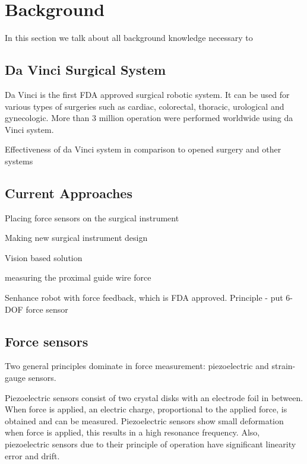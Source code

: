 \chapter{Background}
\label{back}

In this section we talk about all background knowledge necessary to 

\section{Da Vinci Surgical System}
\label{sec:daVinci}

Da Vinci is the first FDA approved surgical robotic system. It can be used for various types of surgeries such as cardiac, colorectal, thoracic, urological and gynecologic. More than 3 million operation were performed worldwide using da Vinci system. \cite{_intuitive_2018}

Effectiveness of da Vinci system in comparison to opened surgery and other systems \cite{yu_safety_2014}

\section{Current Approaches}
\label{sec:CurAppr}

Placing force sensors on the surgical instrument \cite{hong_design_2012}

Making new surgical instrument design \cite{schwalb_forcesensing_2017}

Vision based solution \cite{aviles_towards_2017}

measuring the proximal guide wire force \cite{yoon_design_2015}

Senhance robot with force feedback, which is FDA approved. Principle - put 6-DOF force sensor 


\section{Force sensors}
\label{sec:ForceSensors}

Two general principles dominate in force measurement: piezoelectric and strain-gauge sensors. \cite{SGandP1}

Piezoelectric sensors consist of two crystal disks with an electrode foil in between. When force is applied, an electric charge, proportional to the applied force, is obtained and can be measured. Piezoelectric sensors show small deformation when force is applied, this results in a high resonance frequency. Also, piezoelectric sensors due to their principle of operation have significant linearity error and drift. \cite{SGandP2}

